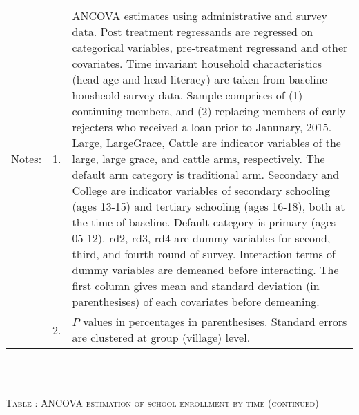 \begin{minipage}[t]{14cm}
\begin{tabular}{>{\hfill\scriptsize}p{1cm}<{}>{\hfill\scriptsize}p{.25cm}<{}>{\scriptsize}p{12cm}<{\hfill}}
Notes: & 1. & ANCOVA estimates using administrative and survey data. Post treatment regressands are regressed on categorical variables, pre-treatment regressand and other covariates. Time invariant household characteristics (head age and head literacy) are taken from baseline housheold survey data. Sample comprises of (1) continuing members, and (2) replacing members of early rejecters who received a loan prior to Janunary, 2015.  \textsf{Large}, \textsf{LargeGrace}, \textsf{Cattle} are indicator variables of the \textsf{large}, \textsf{large grace}, and \textsf{cattle} arms, respectively. The default arm category is \textsf{traditional} arm. \textsf{Secondary} and \textsf{College} are indicator variables of secondary schooling (ages 13-15) and tertiary schooling (ages 16-18), both at the time of baseline. Default category is primary (ages 05-12). \textsf{rd2, rd3, rd4} are dummy variables for second, third, and fourth round of survey. Interaction terms of dummy variables are demeaned before interacting. The first column gives mean and standard deviation (in parenthesises) of each covariates before demeaning. \\
& 2. & $P$ values in percentages in parenthesises. Standard errors are clustered at group (village) level. %
 \end{tabular}
\end{minipage} \\\\\hspace{-1cm}\begin{minipage}[t]{14cm} \hfil\textsc{\normalsize Table \thetable: ANCOVA estimation of school enrollment by time (continued)\label{tab ANCOVA enroll time varying2}}\\ \setlength{\tabcolsep}{1pt}
  \setlength{\baselineskip}{8pt}
  \renewcommand{\arraystretch}{.55}
  \hfil{}\\
\renewcommand{\arraystretch}{.8}
\setlength{\tabcolsep}{1pt} \begin{tabular}{>{\hfill\scriptsize}p{1cm}<{}>{\hfill\scriptsize}p{.25cm}<{}>{\scriptsize}p{12cm}<{\hfill}} 

\end{tabular}
\end{minipage}
